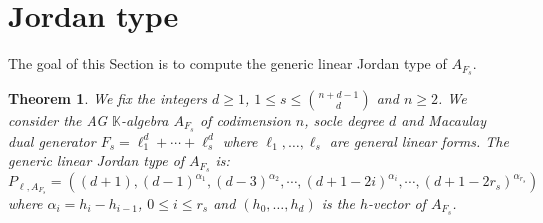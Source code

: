 \documentclass[12pt,twoside]{amsart}
\numberwithin{equation}{section} \hyphenation{semi-stable}
\newcommand{\K}{\mathbb{K}}
\newtheorem{theorem}{Theorem}[section]
\theoremstyle{definition}
\begin{document}
\section{Jordan type}\label{section5}
The goal of this Section is to compute the generic linear Jordan type of $A_{F_s}$.


\begin{theorem}\label{mainthm12} We fix the integers $d \geq 1$, $ 1 \le s \le \binom{n+d-1}{d}$ and $n\ge 2$. We consider the AG $\K$-algebra $A_{F_s}$ of codimension $n$, socle degree $d$ and Macaulay dual generator $F_s=\ell_1^d+\cdots +\ell_s^d$ where $\ell_1, \ldots ,\ell_s$ are general linear forms.   The generic linear Jordan type of $A_{F_s}$ is:
$$ P_{\ell,A_{F_s}}= ((d + 1), (d-1)^{\alpha_1},(d - 3)^{\alpha_2},\cdots,  (d+1-2i)^{\alpha _i}, \cdots , (d+1-2r_s)^{\alpha_{r_s}})$$
where $\alpha _i=h_i-h_{i-1}$, $0\le i \le r_s$ and $(h_0, \dots, h_d)$ is the $h$-vector of $A_{F_s}$.
\end{theorem}
\end{document}
